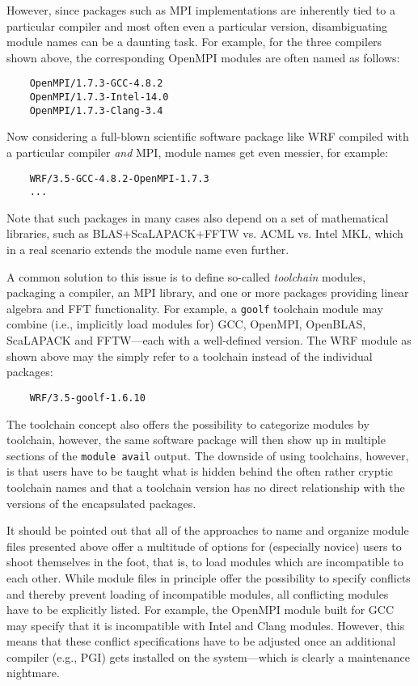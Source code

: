 However, since packages such as MPI implementations are inherently tied to a
particular compiler and most often even a particular version, disambiguating
module names can be a daunting task. For example, for the three compilers
shown above, the corresponding OpenMPI modules are often named as follows:
\begin{verbatim}
    OpenMPI/1.7.3-GCC-4.8.2
    OpenMPI/1.7.3-Intel-14.0
    OpenMPI/1.7.3-Clang-3.4
\end{verbatim}

Now considering a full-blown scientific software package like WRF compiled
with a particular compiler \emph{and} MPI, module names get even messier,
for example:
\begin{verbatim}
    WRF/3.5-GCC-4.8.2-OpenMPI-1.7.3
    ...
\end{verbatim}
Note that such packages in many cases also depend on a set of mathematical
libraries, such as BLAS+ScaLAPACK+FFTW vs. ACML vs. Intel MKL, which in a
real scenario extends the module name even further.

A common solution to this issue is to define so-called \emph{toolchain}
modules, packaging a compiler, an MPI library, and one or more packages
providing linear algebra and FFT functionality. For example, a \texttt{goolf}
toolchain module may combine (i.e., implicitly load modules for) GCC,
OpenMPI, OpenBLAS, ScaLAPACK and FFTW---each with a well-defined version. The
WRF module as shown above may the simply refer to a toolchain instead of the
individual packages:
\begin{verbatim}
    WRF/3.5-goolf-1.6.10
\end{verbatim}
The toolchain concept also offers the possibility to categorize modules by
toolchain, however, the same software package will then show up in multiple
sections of the \texttt{module avail} output. The downside of using
toolchains, however, is that users have to be taught what is hidden behind
the often rather cryptic toolchain names and that a toolchain version has no
direct relationship with the versions of the encapsulated packages.

It should be pointed out that all of the approaches to name and organize
module files presented above offer a multitude of options for (especially
novice) users to shoot themselves in the foot, that is, to load modules which
are incompatible to each other. While module files in principle offer the
possibility to specify conflicts and thereby prevent loading of incompatible
modules, all conflicting modules have to be explicitly listed. For example,
the OpenMPI module built for GCC may specify that it is incompatible with
Intel and Clang modules. However, this means that these conflict
specifications have to be adjusted once an additional compiler (e.g., PGI)
gets installed on the system---which is clearly a maintenance nightmare.

